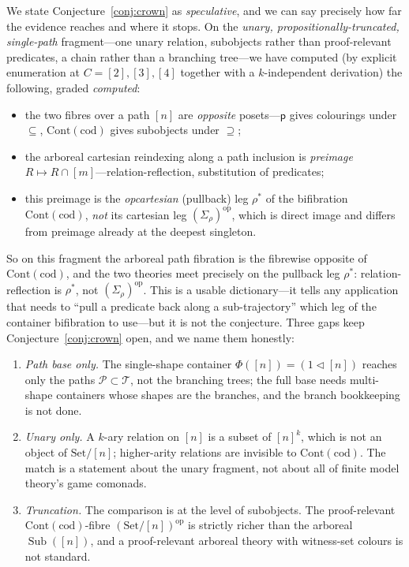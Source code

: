 \documentclass[11pt,reqno]{amsart}
\theoremstyle{plain}
\theoremstyle{definition}
\newcommand{\Set}{\mathrm{Set}}
\newcommand{\Cont}{\mathrm{Cont}}
\newcommand{\cod}{\mathrm{cod}}
\newcommand{\pathfun}{\mathsf{p}}
\newcommand{\T}{\mathcal{T}}
\newcommand{\Paths}{\mathcal{P}}
\newcommand{\op}{\mathrm{op}}
\DeclareMathOperator{\Sub}{Sub}
\begin{document}
We state Conjecture~\ref{conj:crown} as \emph{speculative}, and we can say precisely how far the evidence
reaches and where it stops. On the \emph{unary, propositionally-truncated, single-path} fragment---one
unary relation, subobjects rather than proof-relevant predicates, a chain rather than a branching
tree---we have computed (by explicit enumeration at $C = [2],[3],[4]$ together with a $k$-independent
derivation) the following, graded \emph{computed}:

\begin{itemize}
\item the two fibres over a path $[n]$ are \emph{opposite} posets---$\pathfun$ gives colourings under
$\subseteq$, $\Cont(\cod)$ gives subobjects under $\supseteq$;
\item the arboreal cartesian reindexing along a path inclusion is \emph{preimage}
$R \mapsto R \cap [m]$---relation-reflection, substitution of predicates;
\item this preimage is the \emph{opcartesian} (pullback) leg $\rho^{*}$ of the bifibration
$\Cont(\cod)$, \emph{not} its cartesian leg $(\Sigma_\rho)^{\op}$, which is direct image and differs from
preimage already at the deepest singleton.
\end{itemize}

So on this fragment the arboreal path fibration is the fibrewise opposite of $\Cont(\cod)$, and the two
theories meet precisely on the pullback leg $\rho^{*}$: relation-reflection is $\rho^{*}$, not
$(\Sigma_\rho)^{\op}$. This is a usable dictionary---it tells any application that needs to ``pull a
predicate back along a sub-trajectory'' which leg of the container bifibration to use---but it is not the
conjecture. Three gaps keep Conjecture~\ref{conj:crown} open, and we name them honestly:

\begin{enumerate}
\item \emph{Path base only.} The single-shape container $\Phi([n]) = (1 \triangleleft [n])$ reaches only
the paths $\Paths \subset \T$, not the branching trees; the full base needs multi-shape containers whose
shapes are the branches, and the branch bookkeeping is not done.
\item \emph{Unary only.} A $k$-ary relation on $[n]$ is a subset of $[n]^{k}$, which is not an object of
$\Set/[n]$; higher-arity relations are invisible to $\Cont(\cod)$. The match is a statement about the
unary fragment, not about all of finite model theory's game comonads.
\item \emph{Truncation.} The comparison is at the level of subobjects. The proof-relevant
$\Cont(\cod)$-fibre $(\Set/[n])^{\op}$ is strictly richer than the arboreal $\Sub([n])$, and a
proof-relevant arboreal theory with witness-set colours is not standard.
\end{enumerate}
\end{document}
